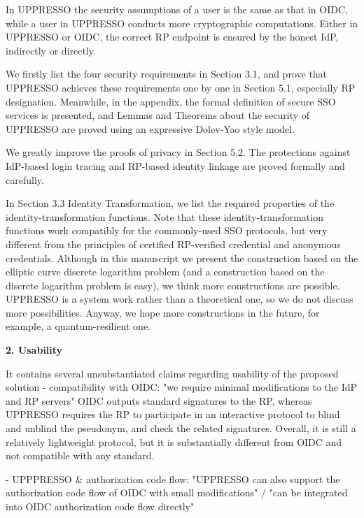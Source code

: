 \documentclass[letterpaper,onecolumn,10pt]{article}
\begin{document}
In UPPRESSO
    the security assumptions of a user is the same as that in OIDC,
        while a user in UPPRESSO conducts more cryptographic computations.
Either in UPPRESSO or OIDC,
    the correct RP endpoint is ensured by the honest IdP, indirectly or directly.

We firstly list the four security requirements in Section 3.1,
    and prove that UPPRESSO achieves these requirements one by one in Section 5.1, especially RP designation.
Meanwhile,
    in the appendix, the formal definition of secure SSO services is presented,
        and Lemmas and Theorems about the security of UPPRESSO are proved using an expressive Dolev-Yao style model.

We greatly improve the proofs of privacy in Section 5.2.
The protections against IdP-based login tracing and RP-based identity linkage are proved formally and carefully.

In Section 3.3 Identity Transformation,
    we list the required properties of the identity-transformation functions.
Note that these identity-transformation functions work compatibly for the commonly-used SSO protocols,
        but very different from the principles of certified RP-verified credential and anonymous credentials.
Although in this manuscript we present the construction based on the elliptic curve discrete logarithm problem
     (and a construction based on the discrete logarithm problem is  easy),
        we think more constructions are possible.
UPPRESSO is a system work rather than a theoretical one, so we do not discuss more possibilities.
Anyway, we hope more constructions in the future, for example, a quantum-resilient one.

\vspace{1mm}\noindent\textbf{2. Usability}

It contains several unsubstantiated claims regarding usability of the proposed solution
- compatibility with OIDC: "we require minimal modifications to the IdP and RP servers"
OIDC outputs standard signatures to the RP, whereas UPPRESSO requires the RP to participate in an interactive protocol to blind and unblind the pseudonym, and check the related signatures. Overall, it is still a relatively lightweight protocol, but it is substantially different from OIDC and not compatible with any standard.

- UPPPRESSO \& authorization code flow: "UPPRESSO can also support the authorization code flow of
OIDC with small modifications" / "can be integrated into OIDC authorization code flow directly"
\end{document}
